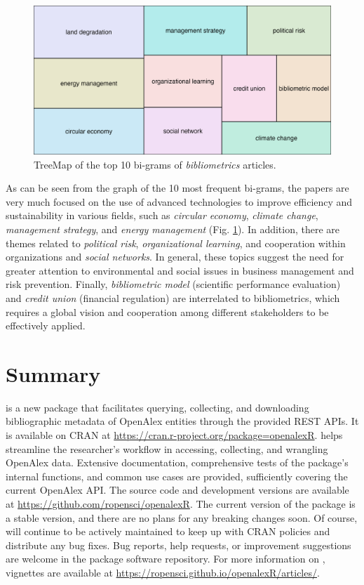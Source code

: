 \begin{figure}[htbp]
  \centering
  \includegraphics[scale=0.6]{figures/ngram-treemap}
  \caption{TreeMap of the top 10 bi-grams of \emph{bibliometrics} articles.}
  \label{treemap}
\end{figure}

As can be seen from the graph of the 10 most frequent bi-grams, the papers are very much focused on the use of advanced technologies to improve efficiency and sustainability in various fields, such as \emph{circular economy}, \emph{climate change}, \emph{management strategy}, and \emph{energy management} (Fig. \ref{treemap}).
In addition, there are themes related to \emph{political risk}, \emph{organizational learning}, and cooperation within organizations and \emph{social networks}. 
In general, these topics suggest the need for greater attention to environmental and social issues in business management and risk prevention.
Finally, \emph{bibliometric model} (scientific performance evaluation) and \emph{credit union} (financial regulation) are interrelated to bibliometrics, which requires a global vision and cooperation among different stakeholders to be effectively applied. 

\section{Summary}
 is a new package that facilitates querying, collecting, and downloading bibliographic metadata of OpenAlex entities through the provided REST APIs.
It is available on CRAN at \url{https://cran.r-project.org/package=openalexR}.
 helps streamline the researcher's workflow in accessing, collecting, and wrangling OpenAlex data.
Extensive documentation, comprehensive tests of the package's internal functions, and common use cases are provided, sufficiently covering the current OpenAlex API.
The source code and development versions are available at \url{https://github.com/ropensci/openalexR}.
The current version of the package is a stable version, and there are no plans for any breaking changes soon.
Of course,  will continue to be actively maintained to keep up with CRAN policies and distribute any bug fixes.
Bug reports, help requests, or improvement suggestions are welcome in the package software repository.
For more information on , vignettes are available at \url{https://ropensci.github.io/openalexR/articles/}.


